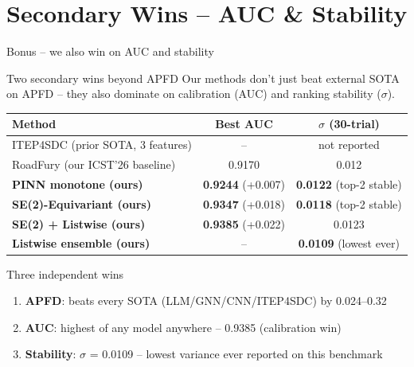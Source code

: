 \documentclass[aspectratio=169,10pt]{beamer}
\begin{document}
\section{Secondary Wins -- AUC \& Stability}

\begin{frame}{Bonus -- we also win on AUC and stability}
\begin{block}{Two secondary wins beyond APFD}
\footnotesize
Our methods don't just beat external SOTA on APFD --
they also dominate on calibration (AUC) and ranking stability ($\sigma$).
\end{block}

\centering\scriptsize
\begin{tabular}{l c c}
  \toprule
  \textbf{Method} & \textbf{Best AUC} & \textbf{$\sigma$ (30-trial)} \\
  \midrule
  ITEP4SDC (prior SOTA, 3 features)        & --     & not reported \\
  RoadFury (our ICST'26 baseline)          & 0.9170 & 0.012 \\
  \rowcolor{accent!10}
  \textbf{PINN monotone (ours)}            & \textbf{0.9244} (+0.007) & \textbf{0.0122} (top-2 stable) \\
  \rowcolor{accent!10}
  \textbf{SE(2)-Equivariant (ours)}        & \textbf{0.9347} (+0.018) & \textbf{0.0118} (top-2 stable) \\
  \rowcolor{accent!15}
  \textbf{SE(2) + Listwise (ours)}         & \textbf{0.9385} (+0.022) & 0.0123 \\
  \rowcolor{accent!15}
  \textbf{Listwise ensemble (ours)}        & --     & \cellcolor{success!15}\textbf{0.0109} (lowest ever) \\
  \bottomrule
\end{tabular}

\vspace{0.7em}
\begin{exampleblock}{Three independent wins}
\footnotesize
\begin{enumerate}
  \item \textbf{APFD}: beats every SOTA (LLM/GNN/CNN/ITEP4SDC) by 0.024--0.32
  \item \textbf{AUC}: highest of any model anywhere -- 0.9385 (calibration win)
  \item \textbf{Stability}: $\sigma$ = 0.0109 -- lowest variance ever reported on this benchmark
\end{enumerate}
\end{exampleblock}
\end{frame}
\end{document}
